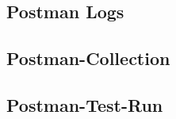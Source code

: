 \begin{appendices}

\section{Postman Logs}

\subsection{Postman-Collection}


\subsection{Postman-Test-Run}



\end{appendices}
